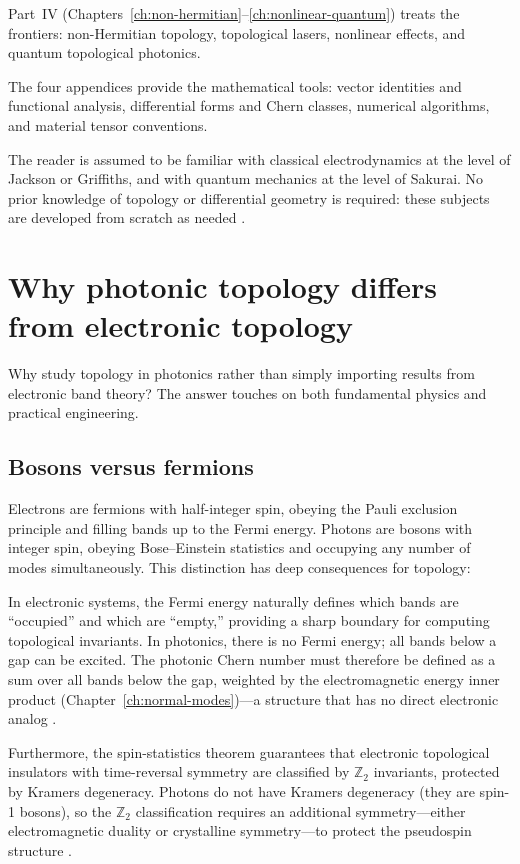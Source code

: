 Part~IV (Chapters~\ref{ch:non-hermitian}--\ref{ch:nonlinear-quantum})
treats the frontiers: non-Hermitian topology, topological lasers,
nonlinear effects, and quantum topological photonics.

The four appendices provide the mathematical tools: vector identities
and functional analysis, differential forms and Chern classes,
numerical algorithms, and material tensor conventions.

The reader is assumed to be familiar with classical electrodynamics
at the level of Jackson or Griffiths, and with quantum mechanics at
the level of Sakurai.  No prior knowledge of topology or differential
geometry is required: these subjects are developed from scratch as
needed \cite{ozawa2018topological}.

\section{Why photonic topology differs from electronic topology}

Why study topology in photonics rather than simply importing results
from electronic band theory?  The answer touches on both fundamental
physics and practical engineering.

\subsection{Bosons versus fermions}
\label{sec:ch1-bosons-vs-fermions}

Electrons are fermions with half-integer spin, obeying the Pauli
exclusion principle and filling bands up to the Fermi energy.  Photons
are bosons with integer spin, obeying Bose--Einstein statistics and
occupying any number of modes simultaneously.  This distinction has
deep consequences for topology:

In electronic systems, the Fermi energy naturally defines which bands
are ``occupied'' and which are ``empty,'' providing a sharp boundary
for computing topological invariants.  In photonics, there is no Fermi
energy; all bands below a gap can be excited.  The photonic Chern
number must therefore be defined as a sum over all bands below the gap,
weighted by the electromagnetic energy inner product
(Chapter~\ref{ch:normal-modes})---a structure that has no direct
electronic analog \cite{gangaraj2016berry,silveirinha2016bulk}.

Furthermore, the spin-statistics theorem guarantees that electronic
topological insulators with time-reversal symmetry are classified by
$\mathbb{Z}_2$ invariants, protected by Kramers degeneracy.  Photons
do not have Kramers degeneracy (they are spin-1 bosons), so the
$\mathbb{Z}_2$ classification requires an additional symmetry---either
electromagnetic duality or crystalline symmetry---to protect the
pseudospin structure
\cite{bliokh2015quantum,mario2016microsoft}.

